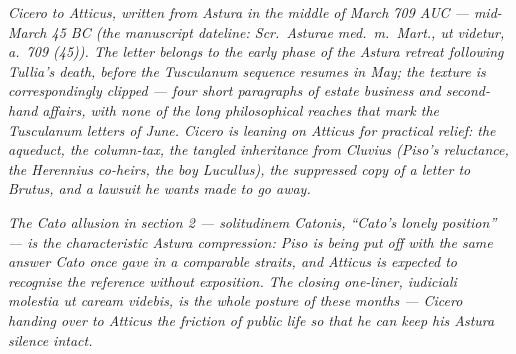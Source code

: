 
\textit{Cicero to Atticus, written from Astura in the
middle of March 709 AUC --- mid-March 45 BC (the
manuscript dateline: \textit{Scr.\ Asturae med.\ m.\
Mart., ut videtur, a.\ 709 (45)}). The letter belongs
to the early phase of the Astura retreat following
Tullia's death, before the Tusculanum sequence
resumes in May; the texture is correspondingly
clipped --- four short paragraphs of estate business
and second-hand affairs, with none of the long
philosophical reaches that mark the Tusculanum
letters of June. Cicero is leaning on Atticus for
practical relief: the aqueduct, the column-tax, the
tangled inheritance from Cluvius (Piso's reluctance,
the Herennius co-heirs, the boy Lucullus), the
suppressed copy of a letter to Brutus, and a lawsuit
he wants made to go away.}

\textit{The Cato allusion in section 2 --- \textit{solitudinem
Catonis}, ``Cato's lonely position'' --- is the
characteristic Astura compression: Piso is being put
off with the same answer Cato once gave in a
comparable straits, and Atticus is expected to
recognise the reference without exposition. The
closing one-liner, \textit{iudiciali molestia ut caream
videbis}, is the whole posture of these months ---
Cicero handing over to Atticus the friction of public
life so that he can keep his Astura silence intact.}
